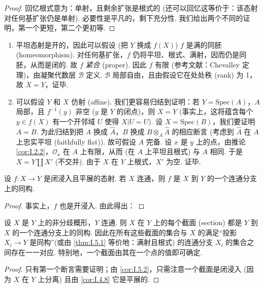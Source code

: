 \begin{proof}
回忆根式意为：单射，且剩余扩张是根式的 (还可以回忆这等价于：该态射对任何基扩张仍是单射). 必要性是平凡的，剩下充分性. 我们给出两个不同的证明，第一个更短，第二个更初等.
\end{proof}

\begin{enumerate}[1)]
\item 平坦态射是开的，因此可以假设 (把 $Y$ 换成 $f(X)$) $f$ 是满的同胚 (homeomorphism). 对任何基扩张，$f$ 仍将平坦、根式、满射，因而仍是同胚，从而是闭的. 故 $f$ \emph{紧合} (proper). 因此 $f$ 有限 (参考文献：Chevalley 定理)，由凝聚代数层 $\mathcal{B}$ 定义. $\mathcal{B}$ 局部自由，且由假设它在处处秩 (rank) 为 1，故 $X = Y$，证毕.
\item 可以假设 $Y$ 和 $X$ 仿射 (affine). 我们更容易归结到证明：若 $Y = \mathrm{Spec}(A)$，$A$ 局部，且 $f^{-1}(y)$ 非空 ($y$ 是 $Y$ 的闭点)，则 $X = Y$ (事实上，这将蕴含每个 $y \in f(X)$ 有一个开邻域 $U$ 使得 $X|U = U$). 设 $X = \mathrm{Spec}(B)$，我们要证明 $A = B$. 为此归结到把 $A$ 换成 $\widehat{A}$，$B$ 换成 $B \otimes_A \widehat{A}$ 的相应断言 (考虑到 $\widehat{A}$ 在 $A$ 上忠实平坦 (faithfully flat)). 故可假设 $A$ 完备. 设 $x$ 是 $y$ 上的点，由推论 \ref{cor:I.2.2}，$\mathcal{O}_x$ 在 $A$ 上有限，从而 (在 $A$ 上平坦且根式) 与 $A$ 相同. 于是 $X = Y \amalg X'$ (不交并). 由于 $X$ 在 $Y$ 上根式，$X'$ 为空. 证毕.
\end{enumerate}

\begin{corollary}\label{cor:I.5.2}
设 $f \colon X \to Y$ 是闭浸入且平展的态射. 若 $X$ 连通，则 $f$ 是 $X$ 到 $Y$ 的一个连通分支上的同构.
\end{corollary}

\begin{proof}
事实上，$f$ 也是开浸入. 由此得出：
\end{proof}

\begin{corollary}\label{cor:I.5.3}
设 $X$ 是 $Y$ 上的非分歧概形，$Y$ 连通. 则 $X$ 在 $Y$ 上的每个截面 (section) 都是 $Y$ 到 $X$ 的一个连通分支上的同构. 因此在所有这些截面的集合与 $X$ 的满足``投影 $X_i \to Y$ 是同构''(或由 \ref{thm:I.5.1} 等价地：满射且根式) 的连通分支 $X_i$ 的集合之间存在一一对应. 特别地，一个截面由其在一个点的值即可确定.
\end{corollary}

\begin{proof}
只有第一个断言需要证明；由 \ref{cor:I.5.2}，只需注意一个截面是闭浸入 (因为 $X$ 在 $Y$ 上分离) 且由 \ref{cor:I.4.8} 它是平展的.
\end{proof}

